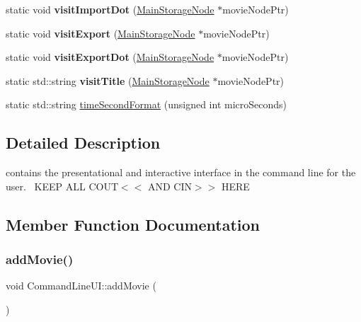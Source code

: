 \begin{DoxyCompactItemize}
static void {\bfseries visit\+Import\+Dot} (\hyperlink{class_main_storage_node}{Main\+Storage\+Node} $\ast$movie\+Node\+Ptr)
\item 
\mbox{\label{class_command_line_u_i_a427b23f81bd822c3d573095e2ebecd53}} 
static void {\bfseries visit\+Export} (\hyperlink{class_main_storage_node}{Main\+Storage\+Node} $\ast$movie\+Node\+Ptr)
\item 
\mbox{\label{class_command_line_u_i_aa9743dcf2e81fe1f370ea643a2e2ccb2}} 
static void {\bfseries visit\+Export\+Dot} (\hyperlink{class_main_storage_node}{Main\+Storage\+Node} $\ast$movie\+Node\+Ptr)
\item 
\mbox{\label{class_command_line_u_i_a081c1a334f1915d5647f468d73bb5eca}} 
static std\+::string {\bfseries visit\+Title} (\hyperlink{class_main_storage_node}{Main\+Storage\+Node} $\ast$movie\+Node\+Ptr)
\item 
static std\+::string \hyperlink{class_command_line_u_i_acb922c21c11df98cbd1604c610393c9c}{time\+Second\+Format} (unsigned int micro\+Seconds)
\end{DoxyCompactItemize}


\subsection{Detailed Description}
contains the presentational and interactive interface in the command line for the user.~\newline
K\+E\+EP A\+LL C\+O\+UT$<$$<$ A\+ND C\+IN$>$$>$ H\+E\+RE 

\subsection{Member Function Documentation}
\mbox{\label{class_command_line_u_i_a0b3406ff32e6d7140811568985411173}} 
\subsubsection{\texorpdfstring{add\+Movie()}{addMovie()}}
{\footnotesize\ttfamily void Command\+Line\+U\+I\+::add\+Movie (\begin{DoxyParamCaption}{ }\end{DoxyParamCaption})\hspace{0.3cm}{\ttfamily [static]}}

